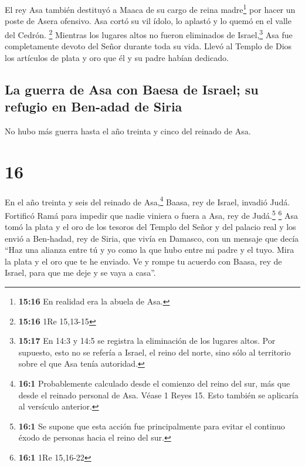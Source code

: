  El rey Asa también destituyó a Maaca de su cargo de
reina madre\footnote{\textbf{15:16} En realidad era la abuela de Asa.}
por hacer un poste de Asera ofensivo. Asa cortó su vil ídolo, lo aplastó
y lo quemó en el valle del Cedrón. \footnote{\textbf{15:16} 1Re 15,13-15}
 Mientras los lugares altos no fueron eliminados de
Israel,\footnote{\textbf{15:17} En 14:3 y 14:5 se registra la
  eliminación de los lugares altos. Por supuesto, esto no se refería a
  Israel, el reino del norte, sino sólo al territorio sobre el que Asa
  tenía autoridad.} Asa fue completamente devoto del Señor durante toda
su vida.  Llevó al Templo de Dios los artículos de plata
y oro que él y su padre habían dedicado.

\hypertarget{la-guerra-de-asa-con-baesa-de-israel-su-refugio-en-ben-adad-de-siria}{%
\subsection{La guerra de Asa con Baesa de Israel; su refugio en Ben-adad
de
Siria}\label{la-guerra-de-asa-con-baesa-de-israel-su-refugio-en-ben-adad-de-siria}}

 No hubo más guerra hasta el año treinta y cinco del
reinado de Asa.

\hypertarget{section-15}{%
\section{16}\label{section-15}}

 En el año treinta y seis del reinado de Asa,\footnote{\textbf{16:1}
  Probablemente calculado desde el comienzo del reino del sur, más que
  desde el reinado personal de Asa. Véase 1 Reyes 15. Esto también se
  aplicaría al versículo anterior.} Baasa, rey de Israel, invadió Judá.
Fortificó Ramá para impedir que nadie viniera o fuera a Asa, rey de
Judá.\footnote{\textbf{16:1} Se supone que esta acción fue
  principalmente para evitar el continuo éxodo de personas hacia el
  reino del sur.} \footnote{\textbf{16:1} 1Re 15,16-22} 
Asa tomó la plata y el oro de los tesoros del Templo del Señor y del
palacio real y los envió a Ben-hadad, rey de Siria, que vivía en
Damasco, con un mensaje que decía  ``Haz una alianza entre
tú y yo como la que hubo entre mi padre y el tuyo. Mira la plata y el
oro que te he enviado. Ve y rompe tu acuerdo con Baasa, rey de Israel,
para que me deje y se vaya a casa''.


